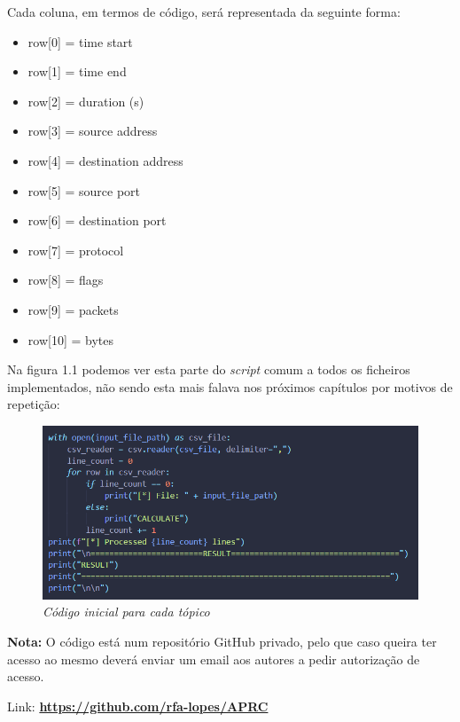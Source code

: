 Cada coluna, em termos de código, será representada da seguinte forma:
\begin{itemize}
    \item row[0] = time start
    \item row[1] = time end
    \item row[2] = duration (s)
    \item row[3] = source address
    \item row[4] = destination address
    \item row[5] = source port
    \item row[6] = destination port
    \item row[7] = protocol
    \item row[8] = flags
    \item row[9] = packets
    \item row[10] = bytes
\end{itemize}

Na figura 1.1 podemos ver esta parte do \textit{script} comum a todos os ficheiros implementados, não sendo esta mais falava nos próximos capítulos por motivos de repetição:

\begin{figure}[h]
    \label{high}
    \centering
    \includegraphics[width=1\textwidth]{Images/reader.png}
    \caption{\textit{Código inicial para cada tópico}}
\end{figure}

\textbf{Nota:} O código está num repositório GitHub privado, pelo que caso queira ter acesso ao mesmo deverá enviar um email aos autores a pedir autorização de acesso.

Link: \textbf{\url{https://github.com/rfa-lopes/APRC}}